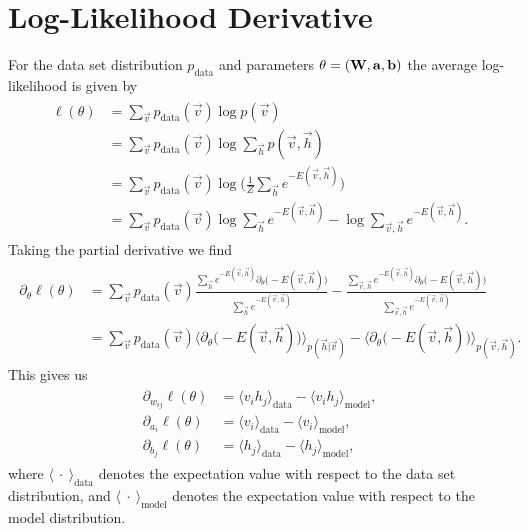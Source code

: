 \section{Log-Likelihood Derivative}\label{app:rbm_log_likelihood_derivation}
For the data set distribution \( p_\text{data} \) and parameters \( \theta = (\mathbf{W}, \mathbf{a}, \mathbf{b}) \) the average log-likelihood is given by
\begin{align}
\begin{split}
    \ell(\theta)
        &= \sum_{\vec{v}} p_{\text{data}}(\vec{v}) \log p(\vec{v}) \\
        &= \sum_{\vec{v}} p_{\text{data}}(\vec{v}) \log \sum_\vec{h} p(\vec{v},\vec{h}) \\
        &= \sum_{\vec{v}} p_{\text{data}}(\vec{v}) \log \bigg(\frac{1}{Z} \sum_\vec{h} e^{-E(\vec{v},\vec{h})}\bigg) \\
        &= \sum_{\vec{v}} p_{\text{data}}(\vec{v}) \log \sum_\vec{h} e^{-E(\vec{v},\vec{h})} - \log \sum_{\vec{v},\vec{h}} e^{-E(\vec{v},\vec{h})}.
\end{split}
\end{align}
Taking the partial derivative we find
\begin{align}
\begin{split}
    \partial_{\theta} \ell(\theta)
        &= \sum_{\vec{v}} p_{\text{data}}(\vec{v}) \frac{\sum_\vec{h} e^{-E(\vec{v},\vec{h})} \partial_{\theta}\big( -E(\vec{v},\vec{h}) \big) }{\sum_\vec{h} e^{-E(\vec{v},\vec{h})}}
            - \frac{\sum_{\vec{v},\vec{h}} e^{-E(\vec{v},\vec{h})} \partial_{\theta}\big( -E(\vec{v},\vec{h}) \big) }{\sum_{\vec{v},\vec{h}} e^{-E(\vec{v},\vec{h})}} \\
        &= \sum_{\vec{v}} p_{\text{data}}(\vec{v}) \Big\langle \partial_{\theta}\big( -E(\vec{v},\vec{h}) \big) \Big\rangle_{p(\vec{h}|\vec{v})}
        - \Big\langle \partial_{\theta}\big( -E(\vec{v},\vec{h}) \big) \Big\rangle_{p(\vec{v},\vec{h})}.
\end{split}
\end{align}
This gives us
\begin{align}
\begin{split}
    \partial_{w_{ij}} \ell(\theta)
        &= \langle v_i h_j \rangle_{\text{data}} - \langle v_i h_j \rangle_{\text{model}}, \\
    \partial_{a_i} \ell(\theta)
        &= \langle v_i \rangle_{\text{data}} - \langle v_i \rangle_{\text{model}}, \\
    \partial_{b_j} \ell(\theta)
        &= \langle h_j \rangle_{\text{data}} - \langle h_j \rangle_{\text{model}},
\end{split}
\end{align}
where \( \langle \ \cdot \ \rangle_{\text{data}} \) denotes the expectation value with respect to the data set distribution, and \( \langle \ \cdot \ \rangle_{\text{model}} \) denotes the expectation value with respect to the model distribution.

